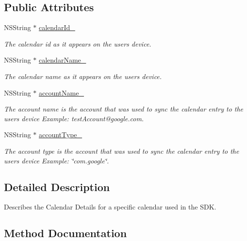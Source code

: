 \subsection*{Public Attributes}
\begin{DoxyCompactItemize}
\item 
N\+S\+String $\ast$ \hyperlink{interface_calendar_details_a9b3e80787b1af5b49eb16a7571cc71a1}{calendar\+Id\+\_\+}
\begin{DoxyCompactList}\small\item\em The calendar id as it appears on the user\textquotesingle{}s device. \end{DoxyCompactList}\item 
N\+S\+String $\ast$ \hyperlink{interface_calendar_details_a4b2d9d44ca1287bfd683d515aa5bf0df}{calendar\+Name\+\_\+}
\begin{DoxyCompactList}\small\item\em The calendar name as it appears on the user\textquotesingle{}s device. \end{DoxyCompactList}\item 
N\+S\+String $\ast$ \hyperlink{interface_calendar_details_a32f09966c244bb21bb5cb64723a61ac4}{account\+Name\+\_\+}
\begin{DoxyCompactList}\small\item\em The account name is the account that was used to sync the calendar entry to the user\textquotesingle{}s device Example\+: test\+Account@google.\+com. \end{DoxyCompactList}\item 
N\+S\+String $\ast$ \hyperlink{interface_calendar_details_a44fa5f16d5d277caaab5482f1b500a0e}{account\+Type\+\_\+}
\begin{DoxyCompactList}\small\item\em The account type is the account that was used to sync the calendar entry to the user\textquotesingle{}s device Example\+: \char`\"{}com.\+google\char`\"{}. \end{DoxyCompactList}\end{DoxyCompactItemize}


\subsection{Detailed Description}
Describes the Calendar Details for a specific calendar used in the S\+D\+K. 

\subsection{Method Documentation}
\hypertarget{interface_calendar_details_aa8aa74d6bd095c8481c892347288156f}{}
